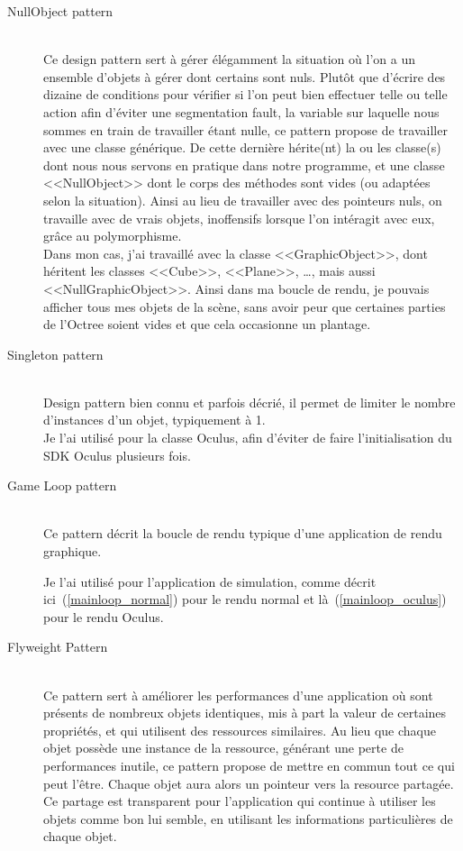 \documentclass[a4paper,french,12pt]{article}
\begin{document}
	    \begin{description}
	     \item [NullObject pattern]~\\
		Ce design pattern sert à gérer élégamment la situation où l'on a un ensemble d'objets à gérer dont certains sont
		nuls. Plutôt que d'écrire des dizaine de conditions pour vérifier si l'on peut bien effectuer telle ou telle action
		afin d'éviter une segmentation fault, la variable sur laquelle nous sommes en train de travailler étant nulle,
		ce pattern propose de travailler avec une classe générique. De cette dernière hérite(nt) la ou les classe(s) dont nous nous
		servons en pratique dans notre programme, et une classe <<NullObject>> dont le corps des méthodes sont vides (ou
		adaptées selon la situation).
		Ainsi au lieu de travailler avec des pointeurs nuls, on travaille avec de vrais objets, inoffensifs lorsque
		l'on intéragit avec eux, grâce au polymorphisme.\\
		
		Dans mon cas, j'ai travaillé avec la classe <<GraphicObject>>, dont héritent les classes <<Cube>>, <<Plane>>, \ldots,
		mais aussi <<NullGraphicObject>>.
		Ainsi dans ma boucle de rendu, je pouvais afficher tous mes objets de la scène, sans avoir peur que certaines parties
		de l'Octree soient vides et que cela occasionne un plantage.
		
	    \item [Singleton pattern]~\\
		Design pattern bien connu et parfois décrié, il permet de limiter le nombre d'instances d'un objet, typiquement
		à 1.\\
		
		Je l'ai utilisé pour la classe Oculus, afin d'éviter de faire l'initialisation du SDK Oculus plusieurs fois.
		
	    \item [Game Loop pattern]~\\
		Ce pattern décrit la boucle de rendu typique d'une application de rendu graphique.
		
		Je l'ai utilisé pour l'application de simulation, comme décrit ici~(\ref{mainloop_normal}) pour le rendu normal
		et là~(\ref{mainloop_oculus}) pour le rendu Oculus.
	    
	    \item [Flyweight Pattern]~\\
	       Ce pattern sert à améliorer les performances d'une application où sont présents de nombreux objets identiques,
	       mis à part la valeur de certaines propriétés, et qui utilisent des ressources similaires.
	       Au lieu que chaque objet possède une instance de la ressource, générant une perte de performances
	       inutile, ce pattern propose de mettre en commun tout ce qui peut l'être. Chaque objet aura alors un pointeur
	       vers la resource partagée. Ce partage est transparent pour l'application qui continue à utiliser les objets 
	       comme bon lui semble, en utilisant les informations particulières de chaque objet.\\
	       

\end{description}
\end{document}
